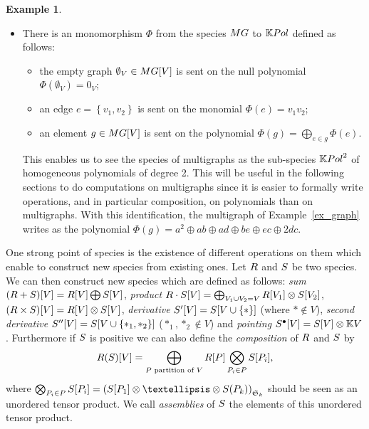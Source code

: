 \documentclass[11pt]{article}
\theoremstyle{definition}
\newtheorem{exam}[theo]{Example}
\numberwithin{equation}{section}
\newcommand{\set}[1]{\left\{#1\right\}}
\newcommand{\spe}[1]{\normalfont{\textsc{#1}}}
\newcommand{\K}{\mathbb{K}}
\newcommand{\symgrp}{\mathfrak{S}}
\newcommand{\point}[1]{#1^{\bullet}}
\newcommand{\MG}{\spe{MG}}
\begin{document}
\begin{exam}
\begin{itemize}
        \item There is an monomorphism $\Phi$ from the species $\MG$ to $\K\spe{Pol}$ defined as follows:
        \begin{itemize}\label{graphpol}
            \item the empty graph $\emptyset_V\in \MG[V]$ is sent on the null polynomial $\Phi(\emptyset_V) = 0_V$;
            \item an edge $e=\set{v_1,v_2}$ is sent on the monomial $\Phi(e) = v_1v_2$;
            \item an element $g\in \MG[V]$ is sent on the polynomial $\Phi(g) = \bigoplus_{e\in g} \Phi(e)$.
        \end{itemize}
        This enables us to see the species of multigraphs as the sub-species $\K\spe{Pol}^2$ of homogeneous 
        polynomials of degree 2. This will be useful in the following sections to do computations on multigraphs since 
        it is easier to formally write operations, and in particular composition, on polynomials than on multigraphs.
        With this identification, the multigraph of Example~\ref{ex_graph} writes as the polynomial 
        $\Phi(g) = a^2\oplus ab\oplus ad\oplus be\oplus ec\oplus 2dc$.
    \end{itemize}
\end{exam}

One strong point of species is the existence of  different operations on them which enable to construct
new species from existing ones. Let $\spe{R}$ and $\spe{S}$ be two species. We can then construct new 
species which are defined as follows: {\em sum} $(\spe{R}+\spe{S})[V] = \spe{R}[V]\bigoplus \spe{S}[V]$, 
{\em product} $\spe{R}\cdot \spe{S}[V] = \bigoplus_{V_1\cup V_2 = V} \spe{R}[V_1]\otimes \spe{S}[V_2]$,
 $(\spe{R}\times \spe{S})[V] = \spe{R}[V]\otimes \spe{S}[V]$, 
{\em derivative} $\spe{S}'[V] = \spe{S}[V\cup\set{\ast}]$ (where $\ast\not\in V$), 
{\em second derivative} $\spe{S}''[V] = \spe{S}[V\cup\set{\ast_1,\ast_2}]$ ($\ast_1,\ast_2\not\in V$) 
and {\em pointing} $\point{\spe{S}}[V] = \spe{S}[V]\otimes \K V$. Furthermore if $\spe{S}$ is positive we 
can also define the {\em composition} of $\spe{R}$ and $\spe{S}$ by
$$\spe{R}(\spe{S})[V] = \bigoplus_{\text{$P$ partition of $V$}}\spe{R}[P]\bigotimes_{P_i\in P} \spe{S}[P_i],$$
where $\bigotimes_{P_i\in P} \spe{S}[P_i]=\left(\spe{S}[P_1]\otimes\dots\otimes\spe{S}(P_k)\right)_{\symgrp_k}$ 
should be seen as an unordered tensor product. We call {\em assemblies} of $\spe{S}$ the elements of
this unordered tensor product.
\end{document}
